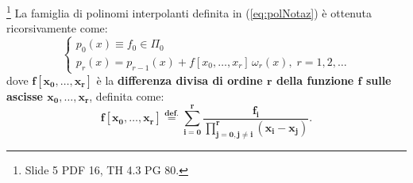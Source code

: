 \begin{theorem}\label{th:formaNewt}\footnote{Slide 5 PDF 16, TH 4.3 PG 80.}
    La famiglia di polinomi interpolanti definita in (\ref{eq:polNotaz}) è ottenuta ricorsivamente come: 
    \begin{equation}\label{eq:famPolInt}
    \begin{cases}
        p_0(x)\equiv f_0\in\Pi_0\\
        p_r(x) = p_{r-1}(x)+ f[x_0,\hdots, x_r]\,\omega_r(x),\; r=1,2,\hdots
    \end{cases}
    \end{equation}
    dove $\boldsymbol{f[x_0, \hdots, x_r]}$ è la \textbf{differenza divisa di ordine $\boldsymbol r$ della funzione $\boldsymbol f$ sulle ascisse $\boldsymbol{x_0, \hdots, x_r}$}, definita come:
    \begin{equation}\label{eq:diffDivisa}
       \boldsymbol{f[x_0, \hdots, x_r] \overset{\text{def.}}{=} \sum_{i=0}^r\frac{f_i}{\prod_{j=0, j\neq i}^{r}(x_i-x_j)}}.
    \end{equation}
\end{theorem}
